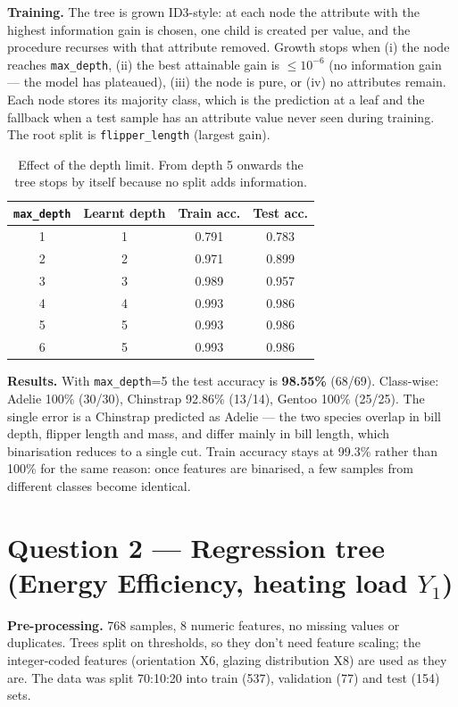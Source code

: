 \documentclass[11pt]{article}
\begin{document}
\textbf{Training.} The tree is grown ID3-style: at each node the attribute with the highest information gain
is chosen, one child is created per value, and the procedure recurses with that attribute removed.
Growth stops when (i) the node reaches \texttt{max\_depth}, (ii) the best attainable gain is $\le 10^{-6}$
(no information gain --- the model has plateaued), (iii) the node is pure, or (iv) no attributes remain.
Each node stores its majority class, which is the prediction at a leaf and the fallback when a test sample
has an attribute value never seen during training. The root split is \texttt{flipper\_length} (largest gain).

\begin{table}[H]\centering
\begin{tabular}{cccc}\toprule
\texttt{max\_depth} & Learnt depth & Train acc. & Test acc.\\\midrule
1 & 1 & 0.791 & 0.783\\
2 & 2 & 0.971 & 0.899\\
3 & 3 & 0.989 & 0.957\\
4 & 4 & 0.993 & 0.986\\
5 & 5 & 0.993 & 0.986\\
6 & 5 & 0.993 & 0.986\\\bottomrule
\end{tabular}
\caption{Effect of the depth limit. From depth 5 onwards the tree stops by itself because no split adds information.}
\end{table}

\textbf{Results.} With \texttt{max\_depth}=5 the test accuracy is \textbf{98.55\%} (68/69).
Class-wise: Adelie 100\% (30/30), Chinstrap 92.86\% (13/14), Gentoo 100\% (25/25). The single error is a
Chinstrap predicted as Adelie --- the two species overlap in bill depth, flipper length and mass, and differ
mainly in bill length, which binarisation reduces to a single cut. Train accuracy stays at 99.3\% rather than
100\% for the same reason: once features are binarised, a few samples from different classes become identical.

\section*{Question 2 --- Regression tree (Energy Efficiency, heating load $Y_1$)}

\textbf{Pre-processing.} 768 samples, 8 numeric features, no missing values or duplicates. Trees split on
thresholds, so they don't need feature scaling; the integer-coded features (orientation X6, glazing distribution X8)
are used as they are. The data was split 70:10:20 into train (537), validation (77) and test (154) sets.
\end{document}
